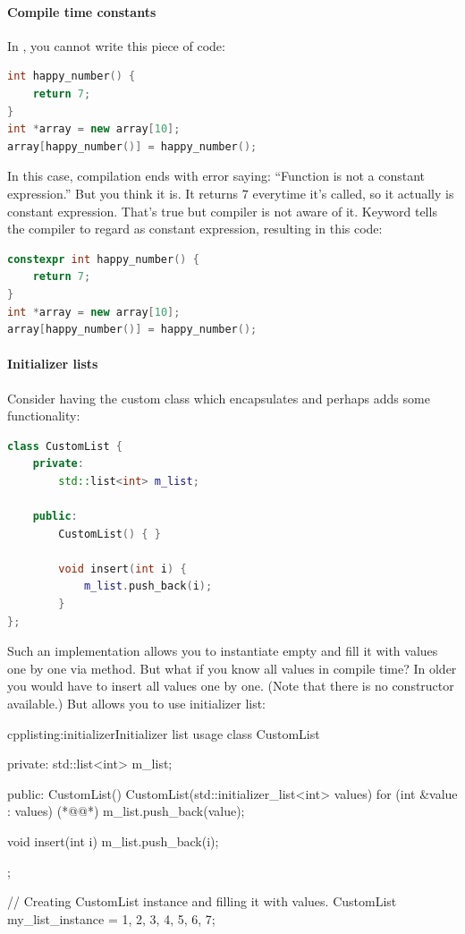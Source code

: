 \paragraph*{Compile time constants}
In , you cannot write this piece of code:
\begin{lstlisting}[firstnumber=1,language=cpp]
int happy_number() {
	return 7;
}
int *array = new array[10];
array[happy_number()] = happy_number();
\end{lstlisting}
In this case, compilation ends with error saying: \enquote{Function  is not a constant expression.} But you think it is. It returns $7$ everytime it's called, so it actually is constant expression. That's true but compiler is not aware of it. Keyword tells the compiler to regard as constant expression, resulting in this code:
\begin{lstlisting}[firstnumber=1,language=cpp]
constexpr int happy_number() {
	return 7;
}
int *array = new array[10];
array[happy_number()] = happy_number();
\end{lstlisting}

\paragraph*{Initializer lists}
Consider having the custom class which encapsulates and perhaps adds some functionality:
\begin{lstlisting}[firstnumber=1,language=cpp]
class CustomList {
	private:
		std::list<int> m_list;
	
	public:
		CustomList() { }
		
		void insert(int i) {
			m_list.push_back(i);		
		}
};
\end{lstlisting}
Such an implementation allows you to instantiate empty and fill it with values one by one via method. But what if you know all values in compile time? In older \cpp{} you would have to insert all values one by one. (Note that there is no constructor available.) But  allows you to use initializer list:
\begin{fdoccode}{cpp}{listing:initializer}{Initializer list usage}
class CustomList {
	private:
		std::list<int> m_list;
	
	public:
		CustomList() { }
		CustomList(std::initializer_list<int> values) {
			for (int &value : values) {(*@\label{listing:forloop}@*)
				m_list.push_back(value);			
			}
		}
		
		void insert(int i) {
			m_list.push_back(i);		
		}
};

// Creating CustomList instance and filling it with values.
CustomList my_list_instance = {1, 2, 3, 4, 5, 6, 7};
\end{fdoccode}

